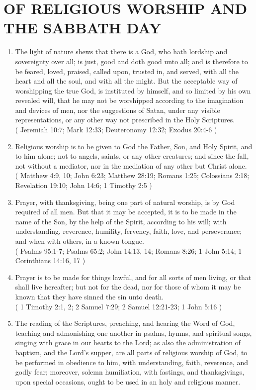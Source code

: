 \documentclass[12pt,a4paper]{book}
\begin{document}
\chapter{OF RELIGIOUS WORSHIP AND THE SABBATH DAY}
\label{ch-rel-wor}
\begin{enumerate}
\item
\label{ch-rel-wor-1}
The light of nature shews that there is a God, who hath lordship and sovereignty over all; is just, good and doth good unto all; and is therefore to be feared, loved, praised, called upon, trusted in, and served, with all the heart and all the soul, and with all the might. But the acceptable way of worshipping the true God, is instituted by himself, and so limited by his own revealed will, that he may not be worshipped according to the imagination and devices of men, nor the suggestions of Satan, under any visible representations, or any other way not prescribed in the Holy Scriptures.\\
( Jeremiah 10:7; Mark 12:33; Deuteronomy 12:32; Exodus 20:4-6 )
\item
\label{ch-rel-wor-2}
Religious worship is to be given to God the Father, Son, and Holy Spirit, and to him alone; not to angels, saints, or any other creatures; and since the fall, not without a mediator, nor in the mediation of any other but Christ alone.\\
( Matthew 4:9, 10; John 6:23; Matthew 28:19; Romans 1:25; Colossians 2:18; Revelation 19:10; John 14:6; 1 Timothy 2:5 )
\item
\label{ch-rel-wor-3}
Prayer, with thanksgiving, being one part of natural worship, is by God required of all men. But that it may be accepted, it is to be made in the name of the Son, by the help of the Spirit, according to his will; with understanding, reverence, humility, fervency, faith, love, and perseverance; and when with others, in a known tongue.\\
( Psalms 95:1-7; Psalms 65:2; John 14:13, 14; Romans 8:26; 1 John 5:14; 1 Corinthians 14:16, 17 )
\item
\label{ch-rel-wor-4}
Prayer is to be made for things lawful, and for all sorts of men living, or that shall live hereafter; but not for the dead, nor for those of whom it may be known that they have sinned the sin unto death.\\
( 1 Timothy 2:1, 2; 2 Samuel 7:29; 2 Samuel 12:21-23; 1 John 5:16 )
\item
\label{ch-rel-wor-5}
The reading of the Scriptures, preaching, and hearing the Word of God, teaching and admonishing one another in psalms, hymns, and spiritual songs, singing with grace in our hearts to the Lord; as also the administration of baptism, and the Lord's supper, are all parts of religious worship of God, to be performed in obedience to him, with understanding, faith, reverence, and godly fear; moreover, solemn humiliation, with fastings, and thanksgivings, upon special occasions, ought to be used in an holy and religious manner.\\

\end{enumerate}
\end{document}
